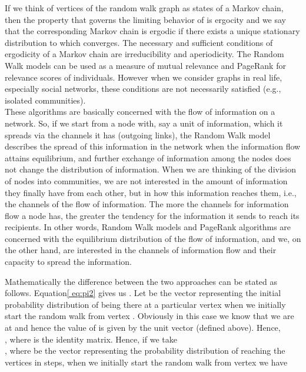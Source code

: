 \documentclass{sig-alternate}
\begin{document}
If we think of vertices of the random walk graph as states of a Markov chain, then the property that governs the limiting behavior of  is ergocity and we say that the corresponding Markov chain is ergodic if there exists a unique stationary distribution  to which  converges. The necessary and sufficient conditions of  ergodicity of a Markov chain are irreducibility and aperiodicity. The Random Walk models can be used as a measure of mutual relevance  and PageRank for relevance scores of individuals. However when we consider graphs in real life, especially social networks, these conditions are not necessarily satisfied (e.g., isolated communities).\\

These algorithms are basically concerned with the flow of information on a network. So, if we start from a node with, say a unit of information, which it spreads via the channels it has (outgoing links), the Random Walk model describes the spread of this information in the network  when the information flow attains equilibrium, and further exchange of information among the nodes does not change the distribution of information. When we are thinking of the division of nodes into communities, we are not interested in the amount of information they finally have from each other, but in how this information reaches them, i.e., the channels of the flow of information. The more the channels for information flow a node has, the greater the tendency for the information it sends to reach its recipients. In other words, Random Walk models and PageRank algorithms are concerned with the equilibrium distribution of the flow of information, and we, on the other hand, are interested in the channels of  information flow and their capacity to spread the information.



Mathematically the difference between the two approaches can be stated as follows. Equation\eqref{ eq:pi2} gives us
.
Let  be the vector representing the initial probability distribution  of being there at a particular vertex  when we initially start the random walk from vertex . Obviously in this case we know that we are at  and hence the value of   is given by the unit vector  (defined above).
Hence, \\
,
where  is the identity matrix.
Hence, if we take \\ ,  where  be the vector representing the probability distribution  of reaching the vertices in  steps, when we initially start the random walk from vertex  we have
\end{document}
